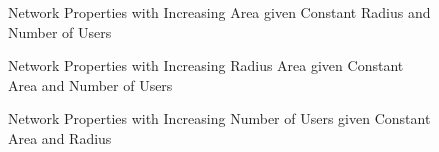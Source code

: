 \begin{figure}
    \caption{Network Properties with Increasing Area given Constant Radius and Number of Users}
    \label{fig:vararea}
\end{figure}
\begin{figure}
    \caption{Network Properties with Increasing Radius Area given Constant Area and Number of Users}
    \label{fig:varradius}
\end{figure}
\begin{figure}
    \caption{Network Properties with Increasing Number of Users given Constant Area and Radius}
    \label{fig:varusers}
\end{figure}
